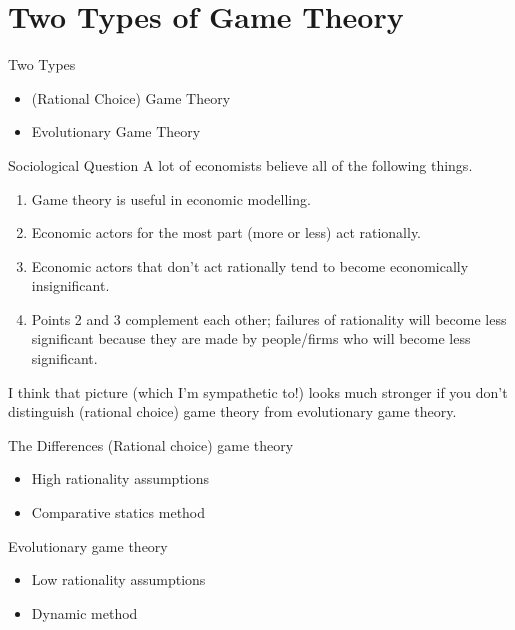 \documentclass[
  ignorenonframetext,
]{beamer}
\providecommand{\tightlist}{%
  \setlength{\itemsep}{0pt}\setlength{\parskip}{0pt}}
\begin{document}
\hypertarget{two-types-of-game-theory}{%
\section{Two Types of Game Theory}\label{two-types-of-game-theory}}

\begin{frame}{Two Types}
\protect\hypertarget{two-types}{}
\begin{itemize}
\tightlist
\item
  (Rational Choice) Game Theory
\item
  Evolutionary Game Theory
\end{itemize}
\end{frame}

\begin{frame}{Sociological Question}
\protect\hypertarget{sociological-question}{}
A lot of economists believe all of the following things.

\begin{enumerate}
\tightlist
\item
  Game theory is useful in economic modelling.
\item
  Economic actors for the most part (more or less) act rationally.
\item
  Economic actors that don't act rationally tend to become economically
  insignificant.
\item
  Points 2 and 3 complement each other; failures of rationality will
  become less significant because they are made by people/firms who will
  become less significant.
\end{enumerate}

I think that picture (which I'm sympathetic to!) looks much stronger if
you don't distinguish (rational choice) game theory from evolutionary
game theory.
\end{frame}

\begin{frame}{The Differences}
\protect\hypertarget{the-differences}{}
(Rational choice) game theory

\begin{itemize}
\tightlist
\item
  High rationality assumptions
\item
  Comparative statics method
\end{itemize}

Evolutionary game theory

\begin{itemize}
\tightlist
\item
  Low rationality assumptions
\item
  Dynamic method
\end{itemize}
\end{frame}
\end{document}
